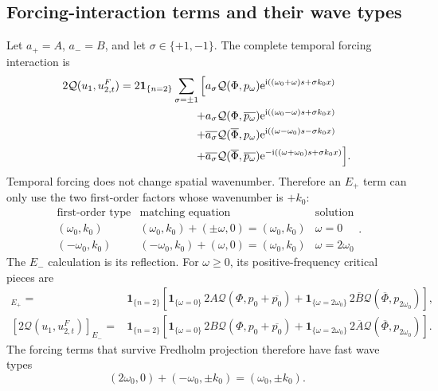 \documentclass[11pt]{article}
\newcommand{\ii}{\mathrm{i}}
\newcommand{\ee}{\mathrm{e}}
\newcommand{\cQ}{\mathcal{Q}}
\newcommand{\one}[1]{\bm{1}_{\{#1\}}}
\begin{document}
\subsection{Forcing-interaction terms and their wave types}

Let $a_+=A$, $a_-=B$, and let $\sigma\in\{+1,-1\}$.  The complete temporal
forcing interaction is
\begin{align}
 2\cQ(u_1,u_{2,t}^F)=2\one{n=2}\sum_{\sigma=\pm1}\Big[{}
 &a_\sigma\cQ(\Phi,p_\omega)
 \ee^{\ii((\omega_0+\omega)s+\sigma k_0x)}
 \notag\\
 +{}&a_\sigma\cQ(\Phi,\overline{p_\omega})
 \ee^{\ii((\omega_0-\omega)s+\sigma k_0x)}
 \notag\\
 +{}&\overline{a_\sigma}\cQ(\overline\Phi,p_\omega)
 \ee^{\ii((\omega-\omega_0)s-\sigma k_0x)}
 \notag\\
 +{}&\overline{a_\sigma}\cQ(\overline\Phi,\overline{p_\omega})
 \ee^{-\ii((\omega+\omega_0)s+\sigma k_0x)}
 \Big].
 \label{eq:temporal-interaction-full}
\end{align}
Temporal forcing does not change spatial wavenumber.  Therefore an $E_+$
term can only use the two first-order factors whose wavenumber is $+k_0$:
\begin{equation}
 \begin{array}{c|c|c}
 \text{first-order type}&\text{matching equation}&\text{solution}\\ \hline
 (\omega_0,k_0)&(\omega_0,k_0)+(\pm\omega,0)
 =(\omega_0,k_0)&\omega=0\\
 (-\omega_0,k_0)&(-\omega_0,k_0)+(\omega,0)
 =(\omega_0,k_0)&\omega=2\omega_0
 \end{array}.
 \label{eq:temporal-selection-logic}
\end{equation}
The $E_-$ calculation is its reflection.
For $\omega\ge0$, its positive-frequency critical pieces are
\begin{align}
 [2\cQ(u_1,u_{2,t}^F)]_{E_+}
 ={}&\one{n=2}\left[
 \one{\omega=0}\,2A\cQ(\Phi,p_0+\overline{p_0})
 +\one{\omega=2\omega_0}\,2\overline B
 \cQ(\overline\Phi,p_{2\omega_0})\right],
 \label{eq:temporal-critical-A}\\
 [2\cQ(u_1,u_{2,t}^F)]_{E_-}
 ={}&\one{n=2}\left[
 \one{\omega=0}\,2B\cQ(\Phi,p_0+\overline{p_0})
 +\one{\omega=2\omega_0}\,2\overline A
 \cQ(\overline\Phi,p_{2\omega_0})\right].
 \label{eq:temporal-critical-B}
\end{align}
The forcing terms that survive Fredholm projection therefore have fast wave
types
\begin{equation}
 \boxed{
 (2\omega_0,0)+(-\omega_0,\pm k_0)
 =(\omega_0,\pm k_0).}
 \label{eq:temporal-wave-match}
\end{equation}
\end{document}
